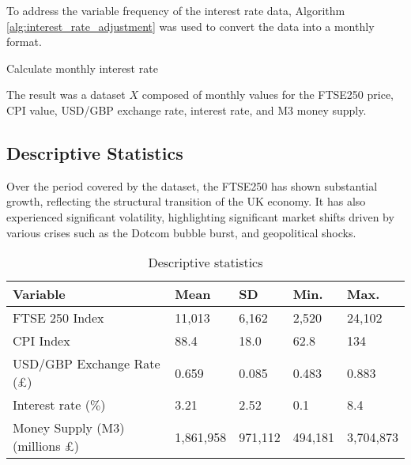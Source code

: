 \documentclass[11pt,a4paper]{article}
\begin{document}
To address the variable frequency of the interest rate data, Algorithm \ref{alg:interest_rate_adjustment}
was used to convert the data into a monthly format.


\begin{algorithm}[H]
    \caption{Calculate monthly interest rate}
    \label{alg:interest_rate_adjustment}
    
\end{algorithm}

The result was a dataset $X$ composed of monthly values for the FTSE250
price, CPI value, USD/GBP exchange rate, interest rate, and M3 money supply. 

\subsection{Descriptive Statistics}

Over the period covered by the dataset, the FTSE250 has 
shown substantial growth, reflecting the structural transition of the UK economy.
It has also experienced significant volatility, highlighting significant market shifts driven by 
various crises such as the Dotcom bubble burst, and geopolitical shocks.

\begin{table}[h!]
    \centering
    \caption{Descriptive statistics}
    \begin{tabular}{lllll}
        \toprule
        \textbf{Variable} & \textbf{Mean} & \textbf{SD} &  \textbf{Min.} & \textbf{Max.}\\
        \midrule
        FTSE 250 Index &  11,013 & 6,162 & 2,520 & 24,102 \\
        CPI Index &  88.4 & 18.0 & 62.8 & 134 \\
        USD/GBP Exchange Rate (£) &  0.659 & 0.085 & 0.483 & 0.883 \\
        Interest rate ($\%$) &  3.21 & 2.52 & 0.1 & 8.4 \\
        Money Supply (M3) (millions £) &  1,861,958 & 971,112 & 494,181 & 3,704,873 \\
        \bottomrule
    \end{tabular}
\end{table}
\end{document}
